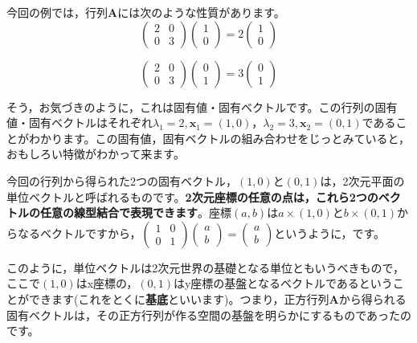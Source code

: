 \documentclass{ltjsbook}
\begin{document}
今回の例では，行列$\bm{A}$には次のような性質があります。
\begin{equation}
	\begin{pmatrix}
		2 & 0 \\
		0 & 3
	\end{pmatrix}
	\begin{pmatrix}
		1 \\
		0
	\end{pmatrix}
	= 2 \begin{pmatrix} 1 \\ 0 \end{pmatrix}
\end{equation}

\begin{equation}
	\begin{pmatrix} 2 & 0\\ 0 & 3 \end{pmatrix} \begin{pmatrix} 0 \\ 1 \end{pmatrix}
	= 3 \begin{pmatrix} 0 \\ 1 \end{pmatrix}
\end{equation}

そう，お気づきのように，これは固有値・固有ベクトルです。この行列の固有値・固有ベクトルはそれぞれ$\lambda_1=2,\bm{x}_1=(1,0)$，$\lambda_2=3,\bm{x}_2=(0,1)$であることがわかります。この固有値，固有ベクトルの組み合わせをじっとみていると，おもしろい特徴がわかって来ます。

今回の行列から得られた2つの固有ベクトル，$(1,0)$と$(0,1)$は，2次元平面の単位ベクトルと呼ばれるものです。\textbf{2次元座標の任意の点は，これら2つのベクトルの任意の線型結合で表現できます}。座標$(a,b)$は$a\times(1,0)$と$b\times(0,1)$からなるベクトルですから，$\begin{pmatrix}1 & 0\\0 & 1\end{pmatrix}\begin{pmatrix}a\\b\end{pmatrix}=\begin{pmatrix}a\\b\end{pmatrix}$というように，です。

このように，単位ベクトルは2次元世界の基礎となる単位ともいうべきもので，ここで$(1,0)$はx座標の，$(0,1)$はy座標の基盤となるベクトルであるということができます(これをとくに\textbf{基底}といいます)。つまり，正方行列$\bm{A}$から得られる固有ベクトルは，その正方行列が作る空間の基盤を明らかにするものであったのです。
\end{document}
